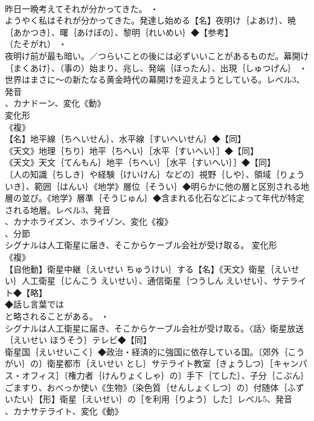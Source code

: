 \documentclass[8pt]{extreport}
\begin{document}
\begin{CJK}{UTF8}{min}
\\	昨日一晩考えてそれが分かってきた。 ・
\\	ようやく私はそれが分かってきた。発達し始める【名】夜明け｛よあけ｝、暁｛あかつき｝、曙｛あけぼの｝、黎明｛れいめい｝◆【参考】
\\	（たそがれ） ・
\\	夜明け前が最も暗い。／つらいことの後には必ずいいことがあるものだ。幕開け｛まくあけ｝、（事の）始まり、兆し、発端｛ほったん｝、出現｛しゅつげん｝ ・
\\	世界はまさに～の新たなる黄金時代の幕開けを迎えようとしている。レベル3、発音
\\	、カナドーン、変化《動》
\\	変化形 
\\	《複》
\\	【名】地平線｛ちへいせん｝、水平線｛すいへいせん｝◆【同】
\\	《天文》地理｛ちり｝地平｛ちへい｝［水平｛すいへい｝］◆【同】
\\	《天文》天文｛てんもん｝地平｛ちへい｝［水平｛すいへい｝］◆【同】
\\	〔人の知識｛ちしき｝や経験｛けいけん｝などの〕視野｛しや｝、領域｛りょういき｝、範囲｛はんい｝《地学》層位｛そうい｝◆明らかに他の層と区別される地層の並び。《地学》層準｛そうじゅん｝◆含まれる化石などによって年代が特定される地層。レベル3、発音
\\	、カナホライズン、ホライゾン、変化《複》
\\	、分節
\\	シグナルは人工衛星に届き、そこからケーブル会社が受け取る。	変化形 
\\	《複》
\\	【自他動】衛星中継｛えいせい ちゅうけい｝する【名】《天文》衛星｛えいせい｝人工衛星｛じんこう えいせい｝、通信衛星｛つうしん えいせい｝、サテライト◆【略】
\\	◆話し言葉では
\\	と略されることがある。 ・
\\	シグナルは人工衛星に届き、そこからケーブル会社が受け取る。〈話〉衛星放送｛えいせい ほうそう｝テレビ◆【同】
\\	衛星国｛えいせいこく｝◆政治・経済的に強国に依存している国。〔郊外｛こうがい｝の〕衛星都市｛えいせい とし｝サテライト教室｛きょうしつ｝［キャンパス・オフィス］〔権力者｛けんりょくしゃ｝の〕手下｛てした｝、子分｛こぶん｝ごますり、おべっか使い《生物》〔染色質｛せんしょくしつ｝の〕付随体｛ふずいたい｝【形】衛星｛えいせい｝の［を利用｛りよう｝した］レベル5、発音
\\	、カナサテライト、変化《動》

\end{CJK}
\end{document}
